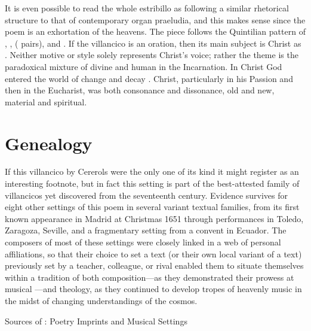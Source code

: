 It is even possible to read the whole estribillo as following a similar
rhetorical structure to that of contemporary organ praeludia, and this makes
sense since the poem is an exhortation of the heavens.%
The piece follows the Quintilian pattern of , ,
 ( pairs), and .
If the villancico is an oration, then its main subject is Christ as .
Neither motive or style solely represents Christ's voice; rather the theme is
the paradoxical mixture of divine and human in the Incarnation.
In Christ God entered the world of change and decay .
Christ, particularly in his Passion and then in the Eucharist, was both
consonance and dissonance, old and new, material and spiritual.


\section{Genealogy}

If this villancico by Cererols were the only one of its kind it might register
as an interesting footnote, but in fact this setting is part of the
best-attested family of villancicos yet discovered from the seventeenth century.
Evidence survives for eight other settings of this poem in several variant
textual families, from its first known appearance in Madrid at Christmas 1651
through performances in Toledo, Zaragoza, Seville, and a fragmentary setting
from a convent in Ecuador. 
The composers of most of these settings were closely linked in a web of personal
affiliations, so that their choice to set a text (or their own local variant of
a text) previously set by a teacher, colleague, or rival enabled them to situate
themselves within a tradition of both composition---as they demonstrated their
prowess at musical ---and theology, as they continued to
develop tropes of heavenly music in the midst of changing understandings of the
cosmos.

{Sources of : Poetry Imprints and
Musical Settings}

